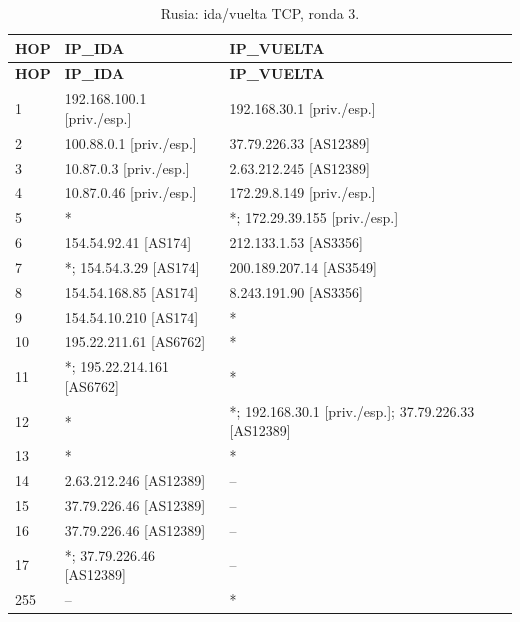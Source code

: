 \begin{longtable}{p{0.95cm}p{7.075cm}p{7.075cm}}
\caption{Rusia: ida/vuelta TCP, ronda 3.}\label{anexo:vuelta:37.79.226.46:TCP:3} \\
\toprule
\textbf{HOP} & \textbf{IP\_\allowbreak{}IDA} & \textbf{IP\_\allowbreak{}VUELTA} \\ \midrule
\endfirsthead
\toprule
\textbf{HOP} & \textbf{IP\_\allowbreak{}IDA} & \textbf{IP\_\allowbreak{}VUELTA} \\ \midrule
\endhead
1 & 192.168.100.1 [priv./esp.] & 192.168.30.1 [priv./esp.] \\
2 & 100.88.0.1 [priv./esp.] & 37.79.226.33 [AS12389] \\
3 & 10.87.0.3 [priv./esp.] & 2.63.212.245 [AS12389] \\
4 & 10.87.0.46 [priv./esp.] & 172.29.8.149 [priv./esp.] \\
5 & * & *; 172.29.39.155 [priv./esp.] \\
6 & 154.54.92.41 [AS174] & 212.133.1.53 [AS3356] \\
7 & *; 154.54.3.29 [AS174] & 200.189.207.14 [AS3549] \\
8 & 154.54.168.85 [AS174] & 8.243.191.90 [AS3356] \\
9 & 154.54.10.210 [AS174] & * \\
10 & 195.22.211.61 [AS6762] & * \\
11 & *; 195.22.214.161 [AS6762] & * \\
12 & * & *; 192.168.30.1 [priv./esp.]; 37.79.226.33 [AS12389] \\
13 & * & * \\
14 & 2.63.212.246 [AS12389] & -- \\
15 & 37.79.226.46 [AS12389] & -- \\
16 & 37.79.226.46 [AS12389] & -- \\
17 & *; 37.79.226.46 [AS12389] & -- \\
255 & -- & * \\
\bottomrule
\end{longtable}
\endgroup

\newpage

